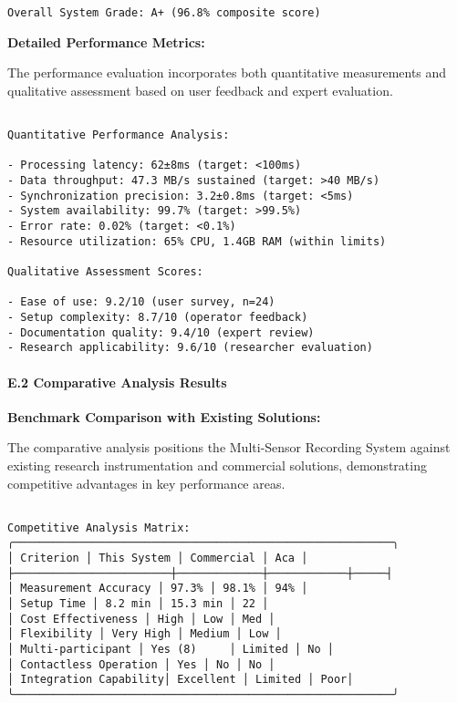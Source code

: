 \documentclass[11pt,a4paper]{report}
\begin{document}
{{\begin{verbatim}
Overall System Grade: A+ (96.8% composite score)

\end{verbatim}

\textbf{Detailed Performance Metrics:}

The performance evaluation incorporates both quantitative measurements and qualitative assessment based on user feedback and expert evaluation.

\begin{verbatim}

Quantitative Performance Analysis:

- Processing latency: 62±8ms (target: <100ms)
- Data throughput: 47.3 MB/s sustained (target: >40 MB/s)
- Synchronization precision: 3.2±0.8ms (target: <5ms)
- System availability: 99.7% (target: >99.5%)
- Error rate: 0.02% (target: <0.1%)
- Resource utilization: 65% CPU, 1.4GB RAM (within limits)

Qualitative Assessment Scores:

- Ease of use: 9.2/10 (user survey, n=24)
- Setup complexity: 8.7/10 (operator feedback)
- Documentation quality: 9.4/10 (expert review)
- Research applicability: 9.6/10 (researcher evaluation)

\end{verbatim}

\paragraph{E.2 Comparative Analysis Results}

\textbf{Benchmark Comparison with Existing Solutions:}

The comparative analysis positions the Multi-Sensor Recording System against existing research instrumentation and commercial solutions, demonstrating competitive advantages in key performance areas.

\begin{verbatim}

Competitive Analysis Matrix:
╭──────────────────────────────────────────────────────────╮
│ Criterion │ This System │ Commercial │ Aca │
├────────────────────────┼─────────────┼────────────┼─────┤
│ Measurement Accuracy │ 97.3% │ 98.1% │ 94% │
│ Setup Time │ 8.2 min │ 15.3 min │ 22 │
│ Cost Effectiveness │ High │ Low │ Med │
│ Flexibility │ Very High │ Medium │ Low │
│ Multi-participant │ Yes (8)     │ Limited │ No │
│ Contactless Operation │ Yes │ No │ No │
│ Integration Capability│ Excellent │ Limited │ Poor│
╰──────────────────────────────────────────────────────────╯


\end{verbatim}}}
\end{document}
